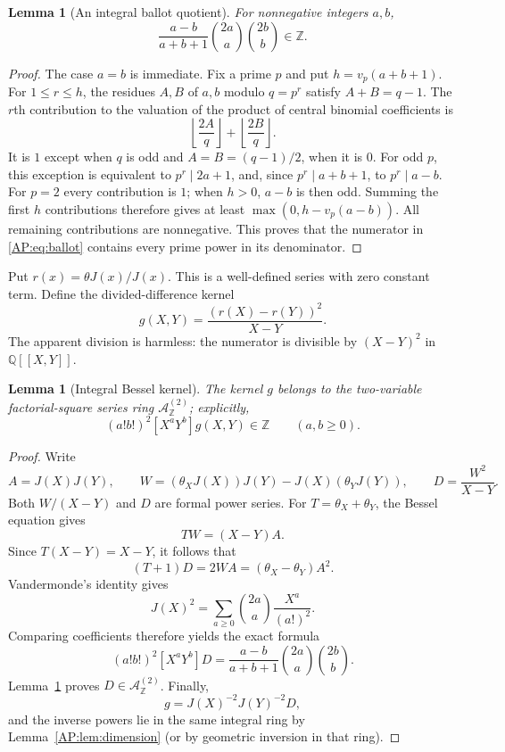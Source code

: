 \documentclass[11pt,a4paper]{article}
\newtheorem{lemma}[theorem]{Lemma}
\theoremstyle{definition}\newtheorem{definition}[theorem]{Definition}
\theoremstyle{remark}\newtheorem{remark}[theorem]{Remark}
\numberwithin{equation}{section}
\newcommand{\ZZ}{\mathbb Z}\newcommand{\QQ}{\mathbb Q}\newcommand{\tht}{\theta}
\begin{document}
\begin{lemma}[An integral ballot quotient]\label{AP:lem:ballot}
For nonnegative integers $a,b$,
\begin{equation}\label{AP:eq:ballot}
 \frac{a-b}{a+b+1}\binom{2a}{a}\binom{2b}{b}\in\ZZ.
\end{equation}
\end{lemma}
\begin{proof}
The case $a=b$ is immediate.  Fix a prime $p$ and put
$h=v_p(a+b+1)$.  For $1\leq r\leq h$, the residues $A,B$ of $a,b$ modulo
$q=p^r$ satisfy $A+B=q-1$.  The $r$th contribution to the valuation of the
product of central binomial coefficients is
\[
 \left\lfloor\frac{2A}{q}\right\rfloor+
 \left\lfloor\frac{2B}{q}\right\rfloor.
\]
It is $1$ except when $q$ is odd and $A=B=(q-1)/2$, when it is $0$.
For odd $p$, this exception is equivalent to $p^r\mid 2a+1$, and, since
$p^r\mid a+b+1$, to $p^r\mid a-b$.  For $p=2$ every contribution is $1$;
when $h>0$, $a-b$ is then odd.  Summing the first $h$ contributions therefore
gives at least $\max(0,h-v_p(a-b))$.  All remaining contributions are
nonnegative.  This proves that the numerator in \eqref{AP:eq:ballot} contains
every prime power in its denominator.
\end{proof}

Put $r(x)=\tht J(x)/J(x)$.  This is a well-defined series with zero constant
term.  Define the divided-difference kernel
\begin{equation}\label{AP:eq:g-def}
 g(X,Y)=\frac{(r(X)-r(Y))^2}{X-Y}.
\end{equation}
The apparent division is harmless: the numerator is divisible by
$(X-Y)^2$ in $\QQ[[X,Y]]$.

\begin{lemma}[Integral Bessel kernel]\label{AP:lem:kernel}
The kernel $g$ belongs to the two-variable factorial-square series ring
$\mathcal A^{(2)}_{\ZZ}$; explicitly,
\[
 (a!b!)^2[X^aY^b]g(X,Y)\in\ZZ\qquad(a,b\geq0).
\]
\end{lemma}
\begin{proof}
Write
\[
 A=J(X)J(Y),\qquad
 W=(\tht_XJ(X))J(Y)-J(X)(\tht_YJ(Y)),\qquad
 D=\frac{W^2}{X-Y}.
\]
Both $W/(X-Y)$ and $D$ are formal power series.  For
$T=\tht_X+\tht_Y$, the Bessel equation gives
\[
 TW=(X-Y)A.
\]
Since $T(X-Y)=X-Y$, it follows that
\[
 (T+1)D=2WA=(\tht_X-\tht_Y)A^2.
\]
Vandermonde's identity gives
\[
 J(X)^2=\sum_{a\geq0}\binom{2a}{a}\frac{X^a}{(a!)^2}.
\]
Comparing coefficients therefore yields the exact formula
\begin{equation}\label{AP:eq:D-coeff}
 (a!b!)^2[X^aY^b]D
  =\frac{a-b}{a+b+1}\binom{2a}{a}\binom{2b}{b}.
\end{equation}
Lemma~\ref{AP:lem:ballot} proves $D\in\mathcal A^{(2)}_{\ZZ}$.
Finally,
\[
 g=J(X)^{-2}J(Y)^{-2}D,
\]
and the inverse powers lie in the same integral ring by
Lemma~\ref{AP:lem:dimension} (or by geometric inversion in that ring).
\end{proof}
\end{document}
